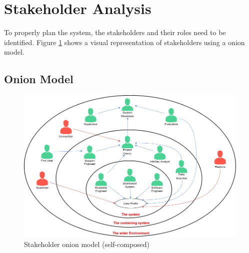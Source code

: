 \section{Stakeholder Analysis}

To properly plan the system, the stakeholders and their roles need to be identified. Figure \ref{fig:stakeholder-onion} shows a visual representation of stakeholders using a onion model.

\subsection{Onion Model}

\begin{figure}[H]
    \includegraphics[width=15cm]{assets/requirement-specification/onion-model.png}
    \caption{Stakeholder onion model (self-composed)}
    \label{fig:stakeholder-onion}
\end{figure}


